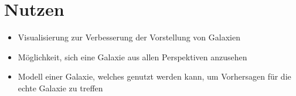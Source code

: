 \section*{Nutzen}

\begin{itemize}
  \item Visualisierung zur Verbesserung der Vorstellung von Galaxien

  \item Möglichkeit, sich eine Galaxie aus allen Perspektiven
  anzusehen

  \item Modell einer Galaxie, welches genutzt werden kann, um Vorhersagen
  für die echte Galaxie zu treffen
\end{itemize}
